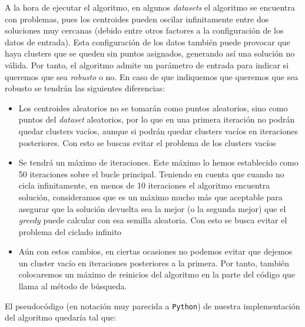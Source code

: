 \documentclass[11pt]{article}
\begin{document}
    A la hora de ejecutar el algoritmo, en algunos \emph{datasets} el algoritmo se encuentra con problemas, pues los centroides pueden oscilar infinitamente entre dos soluciones muy cercanas (debido entre otros factores a la configuración de los datos de entrada). Esta configuración de los datos también puede provocar que haya clusters que se queden sin puntos asignados, generando así una solución no válida. Por tanto, el algoritmo admite un parámetro de entrada para indicar si queremos que sea \emph{robusto} o no. En caso de que indiquemos que queremos que sea robusto se tendrán las siguientes diferencias:

    \begin{itemize}
        \item Los centroides aleatorios no se tomarán como puntos aleatorios, sino como puntos del \emph{dataset} aleatorios, por lo que en una primera iteración no podrán quedar clusters vacíos, aunque si podrán quedar clusters vacíos en iteraciones posteriores. Con esto se buscas evitar el problema de los clusters vacíos
        \item Se tendrá un máximo de iteraciones. Este máximo lo hemos establecido como 50 iteraciones sobre el bucle principal. Teniendo en cuenta que cuando no cicla infinitamente, en menos de 10 iteraciones el algoritmo encuentra solución, consideramos que es un máximo mucho más que aceptable para asegurar que la solución devuelta sea la mejor (o la segunda mejor) que el \emph{greedy} puede calcular con esa semilla aleatoria. Con esto se busca evitar el problema del ciclado infinito
        \item Aún con estos cambios, en ciertas ocasiones no podemos evitar que dejemos un cluster vacío en iteraciones posteriores a la primera. Por tanto, también colocaremos un máximo de reinicios del algoritmo en la parte del código que llama al método de búsqueda.
    \end{itemize}

    El pseudocódigo (en notación muy parecida a \lstinline{Python}) de nuestra implementación del algoritmo quedaría tal que:
\end{document}
